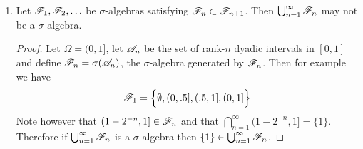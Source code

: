 \begin{enumerate}
\begin{enumerate}[label=(\alph*)]
    \begin{proof}
      Let $\ms F = \bigcup_{n=1}^\infty \ms F_n$. We must show that
      \begin{enumerate}
      \item $\Omega \in \ms F$ \\
        {\bf Proof:} $\ms F_1$ is an algebra, therefore $\Omega \in \ms F_1$, therefore $\Omega \in \ms F$.
      \item If $A \in \ms F$ then $A^c \in \ms F$ \\
        {\bf Proof:} If $A \in \ms F$ then $A \in F_n$ for some $n$. Therefore $A^c \in \ms F_n$. Therefore $A^c \in \ms F$.
      \item If $A, B \in \ms F$ then $A \cup B \in \ms F$ \\
        {\bf Proof:} If $A, B \in \ms F$ then for some $m$ and $n$ we have $A \in \ms F_m$ and $B \in \ms F_n$.
        Suppose $m = n$. Then $A \cup B \in \ms F_m$, therefore $A \cup B \in \ms F$. Alternatively
        suppose $m \neq n$. Then either $\ms F_m \subset \ms F_n$ or $\ms F_n \subset \ms F_m$. Suppose without
        loss of generality that $\ms F_m \subset \ms F_n$. Then $A, B \in \ms F_n$,
        therefore $A \cup B \in \ms F_n$, therefore $A \cup B \in \ms F$.
      \end{enumerate}
    \end{proof}
  \item
    \begin{claim*}
      Let $\mathscr F_1, \mathscr F_2, \ldots$ be $\sigma$-algebras satisfying $\mathscr F_n \subset \mathscr F_{n+1}$.
      Then $\bigcup_{n=1}^\infty \mathscr{F}_n$ may not be a $\sigma$-algebra.
    \end{claim*}

    \begin{proof}
      Let $\Omega = (0, 1]$, let $\mathscr A_n$ be the set of rank-$n$ dyadic intervals in $[0, 1]$ and
      define $\mathscr F_n = \sigma(\mathscr A_n)$, the $\sigma$-algebra generated by $\mathscr F_n$. Then for example we have
      \begin{align*}
        \mathscr F_1 &= \Big\{\emptyset,
                  (0, .5], (.5, 1],
                  (0, 1]
                  \Big\} \\
      \end{align*}
      Note however that $(1 - 2^{-n}, 1] \in \mathscr F_n$ and that $\bigcap_{n=1}^\infty (1 - 2^{-n}, 1] = \{1\}$.
      Therefore if $\bigcup_{n=1}^\infty \mathscr F_n$ is a $\sigma$-algebra
      then $\{1\} \in \bigcup_{n=1}^\infty \mathscr F_n$.


\end{proof}
\end{enumerate}
\end{enumerate}
